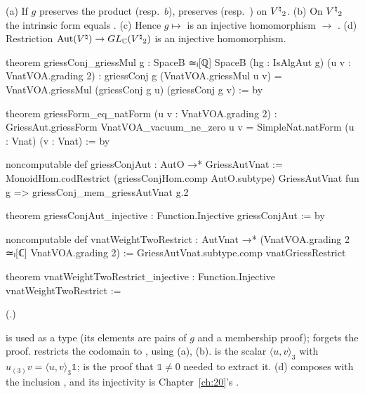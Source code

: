 \begin{theorem}\label{ch21:thm:griessFormNat}
(a) If $g$ preserves the product (resp.\ $b$),  preserves 
(resp.\ ) on ${V^{\natural}}_2$.
(b) On ${V^{\natural}}_2$ the intrinsic form equals .
(c) Hence $g\mapsto$  is an injective homomorphism  $\to$ .
(d) Restriction $\operatorname{Aut}({V^{\natural}})\to GL_{\mathbb{C}}({V^{\natural}}_2)$ is an injective homomorphism.
\end{theorem}
\begin{leancode}
theorem griessConj_griessMul {g : SpaceB ≃ₗ[ℚ] SpaceB} (hg : IsAlgAut g) (u v : VnatVOA.grading 2) :
    griessConj g (VnatVOA.griessMul u v) = VnatVOA.griessMul (griessConj g u) (griessConj g v) := by
\end{leancode}
\begin{leancode}
theorem griessForm_eq_natForm (u v : VnatVOA.grading 2) :
    GriessAut.griessForm VnatVOA_vacuum_ne_zero u v = SimpleNat.natForm (u : Vnat) (v : Vnat) := by
\end{leancode}
\begin{leancode}
noncomputable def griessConjAut : AutO →* GriessAutVnat :=
  MonoidHom.codRestrict (griessConjHom.comp AutO.subtype) GriessAutVnat
    fun g => griessConj_mem_griessAutVnat g.2
\end{leancode}
\begin{leancode}
theorem griessConjAut_injective : Function.Injective griessConjAut := by
\end{leancode}
\begin{leancode}
noncomputable def vnatWeightTwoRestrict : AutVnat →* (VnatVOA.grading 2 ≃ₗ[ℂ] VnatVOA.grading 2) :=
  GriessAutVnat.subtype.comp vnatGriessRestrict
\end{leancode}
\begin{leancode}
theorem vnatWeightTwoRestrict_injective : Function.Injective vnatWeightTwoRestrict :=
\end{leancode}
(.)
\begin{dictionary}
 is used as a type (its elements are pairs of $g$ and a membership proof); 
forgets the proof.   restricts the codomain to , using
(a), (b).   is the scalar $\langle u,v\rangle_3$ with
$u_{(3)}v=\langle u,v\rangle_3\mathbb1$;  is the proof that $\mathbb1\ne0$
needed to extract it.  (d) composes  with the inclusion
, and its injectivity is Chapter~\ref{ch:20}'s
.
\end{dictionary}
